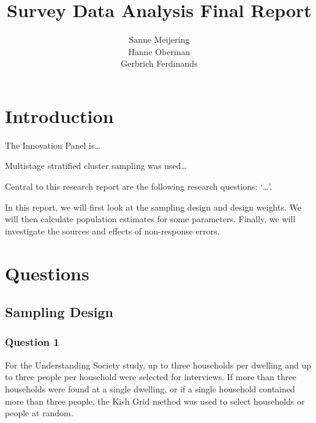 \documentclass[]{article}
\title{Survey Data Analysis Final Report}
\author{Sanne Meijering \\ Hanne Oberman \\ Gerbrich Ferdinands}
\date{}
\newenvironment{Shaded}{\begin{snugshade}}{\end{snugshade}}
\newcommand{\KeywordTok}[1]{\textcolor[rgb]{0.13,0.29,0.53}{\textbf{#1}}}
\newcommand{\StringTok}[1]{\textcolor[rgb]{0.31,0.60,0.02}{#1}}
\newcommand{\OperatorTok}[1]{\textcolor[rgb]{0.81,0.36,0.00}{\textbf{#1}}}
\newcommand{\NormalTok}[1]{#1}
\begin{document}
\maketitle

\begin{Shaded}
\end{Shaded}

\section{Introduction}\label{introduction}

The Innovation Panel is\ldots{}

Multistage stratified cluster sampling was used\ldots{}

Central to this research report are the following research questions:
`\ldots{}'.

In this report, we will first look at the sampling design and design
weights. We will then calculate population estimates for some
parameters. Finally, we will investigate the sources and effects of
non-response errors.

\section{Questions}\label{questions}

\subsection{Sampling Design}\label{sampling-design}

\subsubsection{Question 1}\label{question-1}

For the Understanding Society study, up to three households per dwelling
and up to three people per household were selected for interviews. If
more than three households were found at a single dwelling, or if a
single household contained more than three people, the Kish Grid method
was used to select households or people at random.
\end{document}
